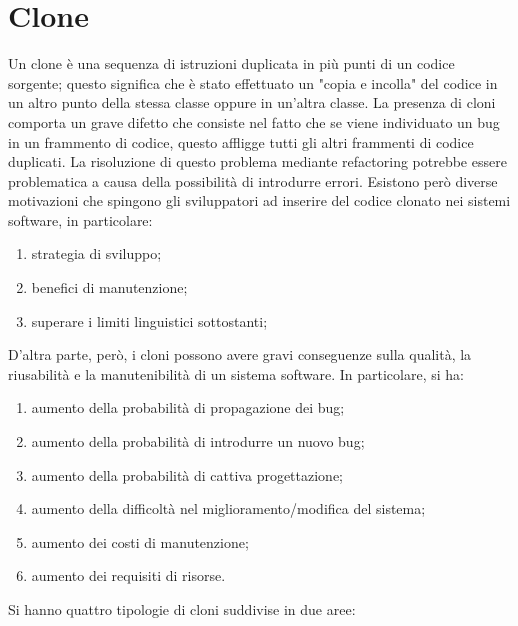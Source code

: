 \section{Clone}
Un clone è una sequenza di istruzioni duplicata in più punti di un codice sorgente; questo significa che è stato effettuato un "copia e incolla" del codice in un altro punto della stessa classe oppure in un'altra classe. La presenza di cloni comporta un grave difetto che consiste nel fatto che se viene individuato un bug in un frammento di codice, questo affligge tutti gli altri frammenti di codice duplicati. La risoluzione di questo problema mediante refactoring potrebbe essere problematica a causa della possibilità di introdurre errori. Esistono però diverse motivazioni che spingono gli sviluppatori ad inserire del codice clonato nei sistemi software, in particolare:
\begin{enumerate}
\item	strategia di sviluppo;
\item	benefici di manutenzione;
\item	superare i limiti linguistici sottostanti;
\end{enumerate}
D'altra parte, però, i cloni possono avere gravi conseguenze sulla qualità, la riusabilità e la manutenibilità di un sistema software. In particolare, si ha:
\begin{enumerate}
\item	aumento della probabilità di propagazione dei bug;
\item	aumento della probabilità di introdurre un nuovo bug;
\item	aumento della probabilità di cattiva progettazione;
\item	aumento della difficoltà nel miglioramento/modifica del sistema;
\item	aumento dei costi di manutenzione;
\item	aumento dei requisiti di risorse.
\end{enumerate}
Si hanno quattro tipologie di cloni suddivise in due aree:
